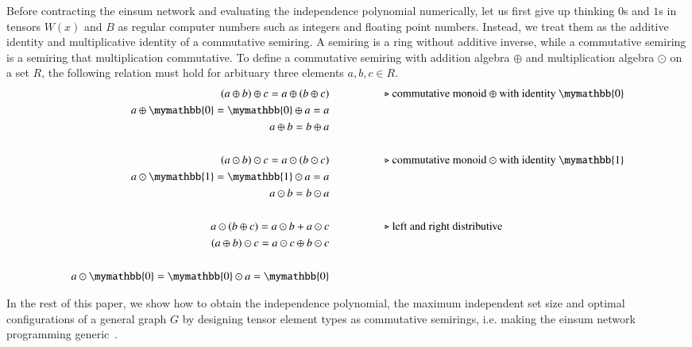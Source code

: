 \documentclass{article}
\newcommand{\<}{\langle}
\renewcommand{\>}{\rangle}
\renewcommand{\cite}[1]{{\citep{#1}}}
\theoremstyle{definition}\newtheorem{definition}{\textit{Definition}}
\begin{document}
Before contracting the einsum network and evaluating the independence polynomial numerically, let us first give up thinking $0$s and $1$s in tensors $W(x)$ and $B$ as regular computer numbers such as integers and floating point numbers.
Instead, we treat them as the additive identity and multiplicative identity of a commutative semiring.
A semiring is a ring without additive inverse, while a commutative semiring is a semiring that multiplication commutative.
To define a commutative semiring with addition algebra $\oplus$ and multiplication algebra $\odot$ on a set $R$, the following relation must hold for arbituary three elements $a, b, c \in R$.
\begin{align*}
(a \oplus b) \oplus c = a \oplus (b \oplus c) & \hspace{5em}\text{$\triangleright$ commutative monoid $\oplus$ with identity $\mymathbb{0}$}\\
a \oplus \mymathbb{0} = \mymathbb{0} \oplus a = a &\\
a \oplus b = b \oplus a &\\
&\\
(a \odot b) \odot c = a \odot (b \odot c)  &   \hspace{5em}\text{$\triangleright$ commutative monoid $\odot$ with identity $\mymathbb{1}$}\\
a \odot  \mymathbb{1} =  \mymathbb{1} \odot a = a &\\
a \odot b = b \odot a &\\
&\\
a \odot (b\oplus c) = a\odot b + a\odot c  &  \hspace{5em}\text{$\triangleright$ left and right distributive}\\
(a\oplus b) \odot c = a\odot c \oplus b\odot c &\\
&\\
a \odot \mymathbb{0} = \mymathbb{0} \odot a = \mymathbb{0}
\end{align*}

In the rest of this paper, we show how to obtain the independence polynomial, the maximum independent set size and optimal configurations of a general graph $G$ by designing tensor element types as commutative semirings,
i.e. making the einsum network programming generic~\cite{Stepanov2014}.
\end{document}
